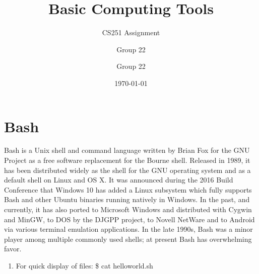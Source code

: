\documentclass{beamer}
\author{ Group 22 }
\author{ Group 22 }
\title[CS251]{Basic Computing Tools}
\subtitle{CS251 Assignment}
\institute{Indian Institute of Technology, Kanpur}
\date{\today}
\begin{document}
\frame{\titlepage}
\section{Bash}
    \begin{frame}
Bash is a Unix shell and command language written by Brian Fox for the GNU Project as a free software replacement for the Bourne shell. Released in 1989, it has been distributed widely as the shell for the GNU operating system and as a default shell on Linux and OS X. It was announced during the 2016 Build Conference that Windows 10 has added a Linux subsystem which fully supports Bash and other Ubuntu binaries running natively in Windows. In the past, and currently, it has also ported to Microsoft Windows and distributed with Cygwin and MinGW, to DOS by the DJGPP project, to Novell NetWare and to Android via various terminal emulation applications. In the late 1990s, Bash was a minor player among multiple commonly used shells; at present Bash has overwhelming favor.
    \end{frame}
    \begin{frame}
        \begin{enumerate}
            \item
                For quick display of files:
                    \$ cat helloworld.sh
\end{enumerate}
    \end{frame}
\end{document}
